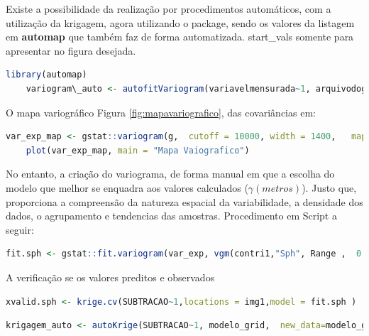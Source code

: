  \hspace*{1.25 cm} Existe a possibilidade da realização por procedimentos automáticos, com a utilização da krigagem,  agora utilizando o package, sendo os valores da listagem em  \textbf{\textcolor{blue!55!black}{automap}} que também faz de forma automatizada. start\_vals somente para apresentar no figura desejada.
 \lstset{
 	language=R, %
 	caption= Auto ajuste do Variograma em linguagem R,} %
 \begin{lstlisting}[language=R]
 	library(automap)
 	variogram\_auto <- autofitVariogram(variavelmensurada~1, arquivodogrid, start\_vals=c(variogramar\$nugget, variogramar\$cov.pars[2], variograma\$cov.pars[1]))
 \end{lstlisting}  
 \hspace*{1.25 cm} O mapa variográfico Figura \ref{fig:mapavariografico}, das covariâncias em:
 \lstset{
 	language=R, %
 	caption= Mapa variografico em linguagem R,} %
 \begin{lstlisting}[language=R]
 	var_exp_map <- gstat::variogram(g, 	cutoff = 10000,	width = 1400, 	map = T)
 	plot(var_exp_map, main = "Mapa Vaiografico")
 \end{lstlisting}  
 \hspace*{1.25 cm}  No entanto, a criação do variograma,  de forma manual  em que a escolha do modelo que melhor se enquadra aos valores calculados ($ \gamma (metros)$). Justo que, proporciona a compreensão da natureza espacial da variabilidade, a densidade dos dados, o agrupamento e tendencias das amostras. Procedimento em Script a seguir:
 \lstset{
 	language=R, %
 	caption= Variograma utilizando função esférica em linguagem R,} %
 \begin{lstlisting}[language=R]
 	fit.sph <- gstat::fit.variogram(var_exp, vgm(contri1,"Sph", Range ,  0.01))
 \end{lstlisting}  
 \hspace*{1.25 cm} A verificação se os valores preditos e observados
 
 
 \lstset{
 	language=R, %
 	caption= Validação cruzada em linguagem R,} %
 \begin{lstlisting}[language=R]
 	xvalid.sph <- krige.cv(SUBTRACAO~1,locations = img1,model = fit.sph ) 
 \end{lstlisting}  
 
 \lstset{
 	language=R, %
 	caption= Krigagem em linguagem R,} %
 \begin{lstlisting}[language=R]
 	krigagem_auto <- autoKrige(SUBTRACAO~1, modelo_grid,  new_data=modelo_grid, start_vals=c(variofit_geor$nugget, variofit_geor$cov.pars[2], variofit_geor$cov.pars[1]))
 \end{lstlisting}  
 

